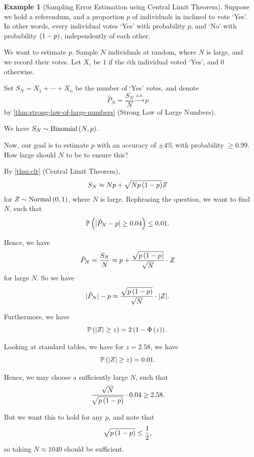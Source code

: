 \documentclass{article}
\theoremstyle{definition}
\newtheorem{example}[theorem]{Example}
\theoremstyle{remark}
\DeclarePairedDelimiter{\abs}{\lvert}{\rvert}
\newcommand{\Prob}{\mathbb{P}}
\newcommand{\toAlmostSure}{\xrightarrow{\mathrm{a.s.}}}
\newcommand{\sNormCdf}{\Phi}
\newcommand{\Binomial}{\operatorname{Binomial}}
\newcommand{\Normal}{\operatorname{Normal}}
\begin{document}
\begin{example}[Sampling Error Estimation using Central Limit Theorem]
    Suppose we hold a referendum, and a proportion \(p\) of individuals in inclined to vote `Yes'. In other words, every individual votes `Yes' with probability \(p\), and `No' with probability \(\left(1 - p\right)\), independently of each other.

    We want to estimate \(p\). Sample \(N\) individuals at random, where \(N\) is large, and we record their votes. Let \(X_i\) be \(1\) if the \(i\)th individual voted `Yes', and \(0\) otherwise.

    Set \(S_N = X_1 + \cdots + X_n\) be the number of `Yes' votes, and denote
    \[
        \hat{P}_N = \frac{S_N}{N} \toAlmostSure p
    \]
    by \autoref{thm:strong-law-of-large-numbers} (Strong Law of Large Numbers).
    
    We have \(S_N \sim \Binomial\pqty{N, p}\).
    
    Now, our goal is to estimate \(p\) with an accuracy of \(\pm 4\%\) with probability \(\geq 0.99\). How large should \(N\) to be to ensure this?

    By \autoref{thm:clt} (Central Limit Theorem),
    \[
        S_N \approx Np + \sqrt{N p \left(1 - p\right)} Z
    \]
    for \(Z \sim \Normal\pqty{0, 1}\), where \(N\) is large. Rephrasing the question, we want to find \(N\), such that
    \[
        \Prob\pqty{\abs{\hat{P}_N - p} \geq 0.04} \leq 0.01.
    \]

    Hence, we have
    \[
        \hat{P}_N = \frac{S_N}{N} \approx p + \frac{\sqrt{p \left(1 - p\right)}}{\sqrt{N}} \cdot Z
    \]  
    for large \(N\). So we have
    \[
        \abs{\hat{P}_N} - p \approx \frac{\sqrt{p \pqty{1 - p}}}{\sqrt{N}} \cdot \abs{Z}.
    \]

    Furthermore, we have
    \[
        \Prob\pqty{\abs{Z} \geq z} = 2 \pqty{1 - \sNormCdf\pqty{z}}.
    \]

    Looking at standard tables, we have for \(z = 2.58\), we have
    \[
        \Prob\pqty{\abs{Z} \geq z} = 0.01.
    \]

    Hence, we may choose a sufficiently large \(N\), such that
    \[
        \frac{\sqrt{N}}{\sqrt{p \left(1 - p\right)}} \cdot 0.04 \geq 2.58.
    \]

    But we want this to hold for any \(p\), and note that
    \[
        \sqrt{p \left(1 - p\right)} \leq \frac{1}{2},
    \]
    so taking \(N \approx 1040\) should be sufficient.
\end{example}
\end{document}
